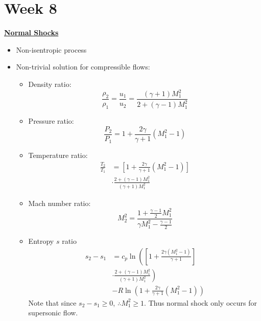 \section{Week 8}
\Large \textbf{{\color{red}\underline{Normal Shocks}}}

\begin{itemize}
    \item Non-isentropic process
    \item Non-trivial solution for {\color{blue}compressible} flows:
    \begin{itemize}
        \item Density ratio:
        \begin{equation*}
            \frac{\rho_2}{\rho_1} = \frac{u_1}{u_2} = \frac{(\gamma + 1)M_1^2}{2+(\gamma - 1)M_1^2}
        \end{equation*}
        \item Pressure ratio:
        \begin{equation*}
            \frac{P_2}{P_1} = 1 + \frac{2 \gamma}{\gamma + 1} (M_1^2 - 1)
        \end{equation*}
        \item Temperature ratio:
        \begin{align*}
            \frac{T_2}{T_1} &= \left[ 1 + \frac{2\gamma}{\gamma + 1}(M_1^2 - 1) \right]\\
            &\cdot \frac{2+(\gamma - 1)M_1^2}{(\gamma + 1)M_1^2}
        \end{align*}
        \item Mach number ratio:
        \begin{equation*}
            M_2^2 = \frac{1+\frac{\gamma - 1}{2}M_1^2}{\gamma M_1^2 - \frac{\gamma - 1}{2}}
        \end{equation*}
        \item Entropy $s$ ratio
        \begin{align*}
            s_2 - s_1 &= c_p \ln\left(\left[1+\frac{2\gamma(M_1^2 - 1)}{\gamma+1}\right]\right. \\
            &\cdot \left. \frac{2+(\gamma-1)M_1^2}{(\gamma + 1)M_1^2}\right) \\
            &- R \ln\left( 1 + \frac{2\gamma}{\gamma + 1}(M_1^2 - 1) \right)
        \end{align*}
        Note that since $s_2 - s_1 \geq 0$, $\therefore M_1^2\geq 1$. Thus normal shock only occurs for supersonic flow.
    \end{itemize}
\end{itemize}

